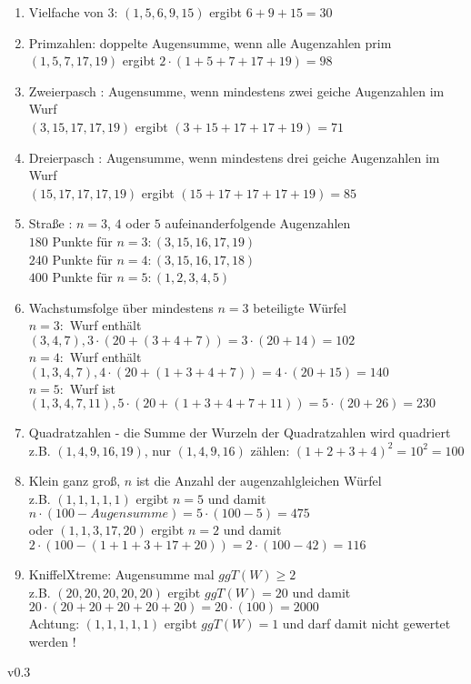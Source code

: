 \documentclass[a4paper,11pt]{exam}
\begin{document}
\begin{enumerate}
\item Vielfache von 3: $( 1,5, 6, 9, 15 )$ ergibt $ 6 + 9 +15 = 30 $ 
\item Primzahlen: doppelte Augensumme, wenn alle Augenzahlen prim \\
             $( 1,5, 7, 17, 19 )$ ergibt $2\cdot(1+5+7+17+19) = 98 $
\item Zweierpasch : Augensumme, 
                    wenn mindestens zwei geiche Augenzahlen im Wurf\\
                     $( 3,15,17,17,19 )$ ergibt $(3+15+17+17+19) = 71 $
\item Dreierpasch : Augensumme, 
                    wenn mindestens drei geiche Augenzahlen im Wurf\\
                     $( 15,17,17,17,19 )$ ergibt $(15+17+17+17+19) = 85 $
\item Straße : $n=3$, $4$ oder $5$ aufeinanderfolgende Augenzahlen\\
                $180$ Punkte für $n=3: ( 3,15,16,17,19 )$ \\   
                $240$ Punkte für $n=4: ( 3,15,16,17,18 )$ \\   
                $400$ Punkte für $n=5: ( 1,2,3,4,5 )$ 
\item Wachstumsfolge über mindestens $n=3$ beteiligte Würfel\\
       $n=3:$ Wurf enthält $(3,4,7), 3\cdot (20 + (3+4+7)) = 3\cdot (20+14)= 102 $\\
       $n=4:$ Wurf enthält $(1,3,4,7), 4\cdot (20 + (1+3+4+7)) = 4\cdot (20+15)= 140 $\\
       $n=5:$ Wurf ist   $(1,3,4,7,11), 5\cdot (20 + (1+3+4+7+11)) = 5\cdot (20+26)=230$
\item Quadratzahlen - die Summe der Wurzeln der Quadratzahlen wird quadriert\\
       z.B. $(1,4,9,16,19)$, nur $(1,4,9,16)$ zählen: $(1 + 2 + 3 +4)^2=10^2=100$
\item Klein ganz groß, $n$ ist die Anzahl der augenzahlgleichen Würfel\\
       z.B. $(1,1,1,1,1)$ ergibt $n=5$ und damit 
       $n\cdot (100 - Augensumme)=5\cdot(100-5)=475$\\
       oder $(1,1,3,17,20)$ ergibt $n=2$ und damit $2\cdot(100-(1+1+3+17+20))=
       2\cdot(100-42)=116$
\item KniffelXtreme: Augensumme mal $ggT(W)\geq 2$\\
       z.B. $(20,20,20,20,20)$ ergibt $ggT(W)=20$ und damit 
       $20\cdot (20+20+20+20+20)=20\cdot(100)=2000$\\
       Achtung: $(1,1,1,1,1)$ ergibt $ggT(W)=1$ und darf damit nicht gewertet werden ! 
\end{enumerate}

\vfill
\small{v0.3}
\end{document}
